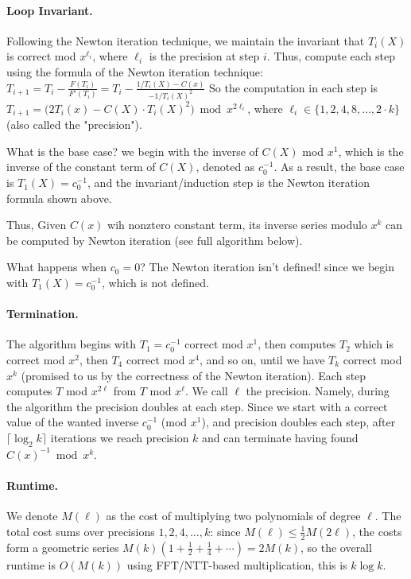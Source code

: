 \paragraph{Loop Invariant.}
Following the Newton iteration technique, we maintain the invariant that $T_i(X)$ is correct mod $x^{\ell_i}$, where $\ell_i$ is the precision at step $i$.
Thus, compute each step using the formula of the Newton iteration technique:
$T_{i+1}= T_i - \frac{F(T_i)}{F'(T_i)}= T_i - \frac{1/T_i(X)-C(x)}{-1/T_i(X)^2}$
So the computation in each step is $T_{i+1}= \bigl(2T_i(x)-C(X) \cdot T_i(X)^2\bigr) \bmod x^{2\ell_i}$, where $\ell_i\in \{1,2,4,8,\dots,2\cdot k\}$ (also called the "precision").

What is the base case? we begin with the inverse of $C(X)$ mod $x^1$, which is the inverse of the constant term of $C(X)$, denoted as $c_0^{-1}$. As a result, the base case is $T_1(X)=c_0^{-1}$, and the invariant/induction step is the Newton iteration formula shown above.

Thus, Given $C(x)$ wih nonztero constant term, its inverse series modulo $x^k$ can be
computed by Newton iteration (see full algorithm below).

\begin{notice}
What happens when $c_0=0$? The Newton iteration isn't defined! since we begin with $T_1(X)=c_0^{-1}$, which is not defined.
\end{notice}

\paragraph{Termination.}
The algorithm begins with $T_1 = c_0^{-1}$ correct mod $x^1$, then computes $T_2$ which is correct mod $x^2$, then $T_4$ correct mod $x^4$, and so on, until we have $T_k$ correct mod $x^k$ (promised to us by the correctness of the Newton iteration).
Each step computes $T$ mod $x^{2\ell}$ from $T$ mod $x^\ell$. We call $\ell$ the precision. 
Namely, during the algorithm the precision doubles at each step. 
Since we start with a correct value of the wanted inverse $c_0^{-1}$ (mod $x^1$), and precision doubles each step, after $\lceil\log_2 k\rceil$ iterations we reach precision $k$ and can terminate having found $C(x)^{-1} \bmod x^k$.


\paragraph{Runtime.}
We denote $M(\ell)$ as the cost of multiplying two polynomials of degree $\ell$.
The total cost sums over precisions $1, 2, 4, \dots, k$: since $M(\ell) \le \frac{1}{2}M(2\ell)$, the costs form a geometric series $M(k)(1 + \frac{1}{2} + \frac{1}{4} + \cdots) = 2M(k)$, so the overall runtime is $O(M(k))$ using FFT/NTT-based multiplication, this is $k \log k$.

